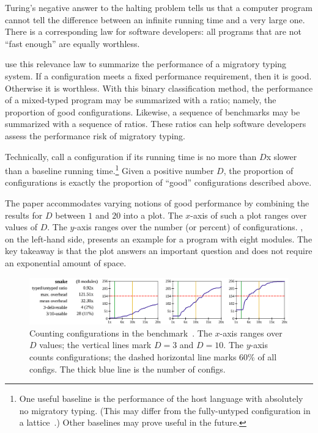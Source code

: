 
Turing's negative answer to the halting problem tells us that a computer
 program cannot tell the difference between an infinite running time and
 a very large one.
There is a corresponding law for software developers:
 all programs that are not ``fast enough'' are equally worthless.

\citet{tfgnvf-popl-2016} use this relevance law to summarize the performance
 of a migratory typing system.
If a configuration meets a fixed performance requirement, then it is good.
Otherwise it is worthless.
With this binary classification method, the performance of a mixed-typed
 program may be summarized with a ratio; namely,
 the proportion of good configurations.
Likewise, a sequence of benchmarks may be summarized with a sequence of ratios.
These ratios can help software developers assess the performance risk of
 migratory typing.

Technically, \citet{tfgnvf-popl-2016} call a configuration 
 if its running time is no more than $D$x slower than a baseline running
 time.\footnote{One useful baseline is the performance of the host language
 with absolutely no migratory typing.
 (This may differ from the fully-untyped configuration in a lattice~\cite{gm-pepm-2018}.)
 Other baselines may prove useful in the future.}
Given a positive number $D$, the proportion of  configurations
 is exactly the proportion of ``good'' configurations described above.

The paper accommodates varying notions of good performance by combining the
 results for $D$ between $1$ and $20$ into a plot.
The $x$-axis of such a plot ranges over values of $D$.
The $y$-axis ranges over the number (or percent) of configurations.
, on the left-hand side, presents an example
 for a program with eight modules.
The key takeaway is that the plot answers an important question and does
 not require an exponential amount of space.

\begin{figure}[h]
\includegraphics[width=0.96\columnwidth]{src/snake-popl.png}
\caption{Counting  configurations in the 
         benchmark~\cite{tfgnvf-popl-2016}. The $x$-axis ranges over $D$ values;
         the vertical lines mark $D=3$ and $D=10$.
         The $y$-axis counts configurations; the dashed horizontal line marks
         $60$\% of all configs.
         The thick blue line is the number of  configs.}
\label{fig:snake-popl}
\end{figure}

